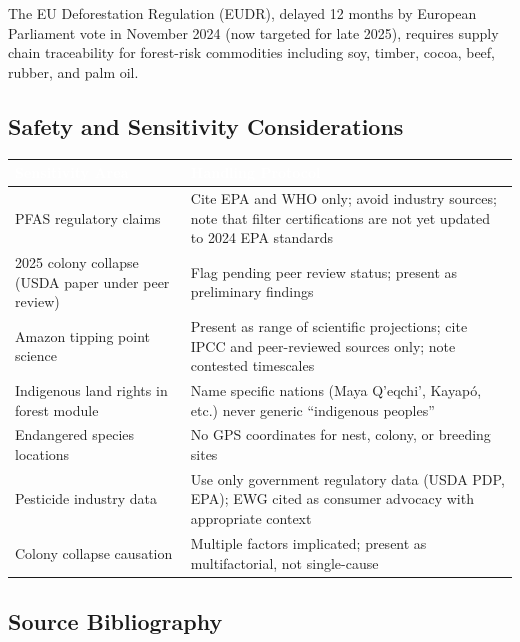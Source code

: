 \documentclass[11pt,letterpaper]{article}
\newcommand{\tableheader}[1]{\textbf{\sffamily\textcolor{white}{#1}}}
\begin{document}
The EU Deforestation Regulation (EUDR), delayed 12 months by European Parliament vote in November 2024 (now targeted for late 2025), requires supply chain traceability for forest-risk commodities including soy, timber, cocoa, beef, rubber, and palm oil.

\subsection{Safety and Sensitivity Considerations}

\begin{center}
\begin{tabularx}{\textwidth}{L{4cm}X}
\toprule
{}
\tableheader{Sensitivity Area} & \tableheader{Handling Protocol} \\
\midrule
PFAS regulatory claims & Cite EPA and WHO only; avoid industry sources; note that filter certifications are not yet updated to 2024 EPA standards \\
2025 colony collapse (USDA paper under peer review) & Flag pending peer review status; present as preliminary findings \\
Amazon tipping point science & Present as range of scientific projections; cite IPCC and peer-reviewed sources only; note contested timescales \\
Indigenous land rights in forest module & Name specific nations (Maya Q'eqchi', Kayap\'o, etc.) never generic ``indigenous peoples'' \\
Endangered species locations & No GPS coordinates for nest, colony, or breeding sites \\
Pesticide industry data & Use only government regulatory data (USDA PDP, EPA); EWG cited as consumer advocacy with appropriate context \\
Colony collapse causation & Multiple factors implicated; present as multifactorial, not single-cause \\
\bottomrule
\end{tabularx}
\end{center}

\subsection{Source Bibliography}
\end{document}
